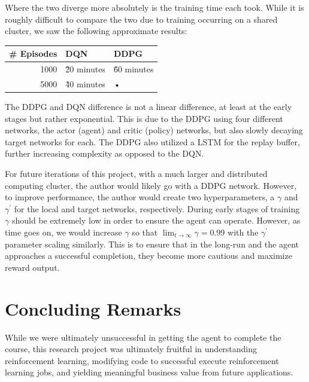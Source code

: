 \documentclass[doc, onecolumn, 12pt]{apa6}
\begin{document}
Where the two diverge more absolutely is the training time each took. While it is roughly difficult to compare the two due to training occurring on a shared cluster, we saw the following approximate results:

\begin{tabular}{r||ll}
\hline 
\# Episodes & DQN & DDPG \\ 
\hline 
1000 &  \~ 20 minutes &  \~ 60 minutes \\ 
5000 & \~ 40 minutes & • \\ 
\hline
\end{tabular} 


The DDPG and DQN difference is not a linear difference, at least at the early stages but rather exponential. This is due to the DDPG using four different networks, the actor (agent) and critic (policy) networks, but also slowly decaying target networks for each. The DDPG also utilized a LSTM for the replay buffer, further increasing complexity as opposed to the DQN. 

For future iterations of this project, with a much larger and distributed computing cluster, the author would likely go with a DDPG network. However, to improve performance, the author would create two hyperparameters, a $\gamma$ and $\gamma^{\prime}$ for the local and target networks, respectively. During early stages of training $\gamma$ should be extremely low in order to  ensure the agent can operate. However, as time goes on, we would increase $\gamma$ so that $\lim_{t \to \infty} \gamma = 0.99$ with the $\gamma^{\prime}$ parameter scaling similarly. This is to ensure that in the long-run and the agent approaches a successful completion, they become more cautious and maximize reward output. 




\newpage 
\section{Concluding Remarks}

While we were ultimately unsuccessful  in getting the agent to complete the course, this research project was ultimately fruitful in understanding reinforcement learning, modifying code to successful execute reinforcement learning jobs, and yielding meaningful business value from future applications. 
\end{document}
